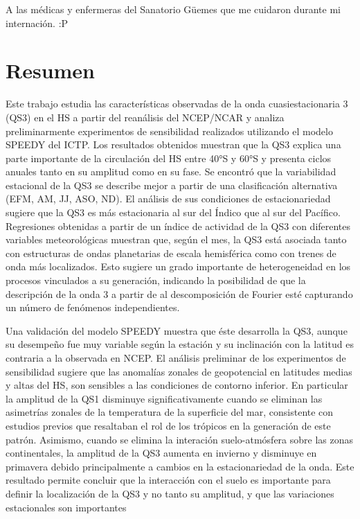 \documentclass[spanish,a4paper,12pt,oneside]{book}
\begin{document}
A las médicas y enfermeras del Sanatorio Güemes que me cuidaron durante
mi internación. :P

\newpage

 \chapter*{Resumen}

Este trabajo estudia las características observadas de la onda
cuasiestacionaria 3 (QS3) en el HS a partir del reanálisis del NCEP/NCAR
y analiza preliminarmente experimentos de sensibilidad realizados
utilizando el modelo SPEEDY del ICTP. Los resultados obtenidos muestran
que la QS3 explica una parte importante de la circulación del HS entre
40°S y 60°S y presenta ciclos anuales tanto en su amplitud como en su
fase. Se encontró que la variabilidad estacional de la QS3 se describe
mejor a partir de una clasificación alternativa (EFM, AM, JJ, ASO, ND).
El análisis de sus condiciones de estacionariedad sugiere que la QS3 es
más estacionaria al sur del Índico que al sur del Pacífico. Regresiones
obtenidas a partir de un índice de actividad de la QS3 con diferentes
variables meteorológicas muestran que, según el mes, la QS3 está
asociada tanto con estructuras de ondas planetarias de escala
hemisférica como con trenes de onda más localizados. Esto sugiere un
grado importante de heterogeneidad en los procesos vinculados a su
generación, indicando la posibilidad de que la descripción de la onda 3
a partir de al descomposición de Fourier esté capturando un número de
fenómenos independientes.

Una validación del modelo SPEEDY muestra que éste desarrolla la QS3,
aunque su desempeño fue muy variable según la estación y su inclinación
con la latitud es contraria a la observada en NCEP. El análisis
preliminar de los experimentos de sensibilidad sugiere que las anomalías
zonales de geopotencial en latitudes medias y altas del HS, son
sensibles a las condiciones de contorno inferior. En particular la
amplitud de la QS1 disminuye significativamente cuando se eliminan las
asimetrías zonales de la temperatura de la superficie del mar,
consistente con estudios previos que resaltaban el rol de los trópicos
en la generación de este patrón. Asimismo, cuando se elimina la
interación suelo-atmósfera sobre las zonas continentales, la amplitud de
la QS3 aumenta en invierno y disminuye en primavera debido
principalmente a cambios en la estacionariedad de la onda. Este
resultado permite concluir que la interacción con el suelo es importante
para definir la localización de la QS3 y no tanto su amplitud, y que las
variaciones estacionales son importantes
\end{document}

